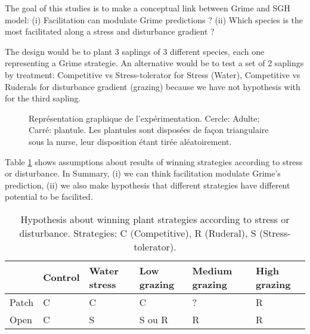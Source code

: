 \documentclass[12pt]{report} %
\begin{document}
\begin{figure}
\begin{center}
\end{center}
\end{figure}



The goal of this studies is to make a conceptual link between Grime and SGH model: (i) Facilitation can modulate Grime predictions ? (ii) Which species is the most facilitated along a stress and disturbance gradient ?

The design would be to plant 3 saplings of 3 different species, each one representing a Grime strategie. An alternative would be to test a set of 2 saplings by treatment: Competitive vs Stress-tolerator for Stress (Water), Competitive vs Ruderals for disturbance gradient (grazing) because we have not hypothesis with for the third sapling.

\begin{figure}
\begin{center}
\end{center}
\caption{Représentation graphique de l'expérimentation. Cercle: Adulte; Carré: plantule. Les plantules sont disposées de façon triangulaire sous la nurse, leur disposition étant tirée aléatoirement.}
\end{figure}

Table \ref{hyp} shows assumptions about results of winning strategies according to stress or disturbance. In Summary, (i) we can think facilitation modulate Grime's prediction, (ii) we also make hypothesis that different strategies have different potential to be facilited.



\begin{table}
\begin{center}
\begin{tabular}{|l|l|l|l|l|l|}
  \hline
  & Control & Water stress & Low grazing & Medium grazing & High grazing  \\
  \hline
  Patch & C & C & C & ? & R \\
  \hline
  Open & C & S & S ou R & R & R \\
  \hline
\end{tabular} 
\end{center}
\caption{Hypothesis about winning plant strategies according to stress or disturbance.  Strategies: C (Competitive), R (Ruderal), S (Stress-tolerator). \label{hyp}}
\end{table}






\end{document}
